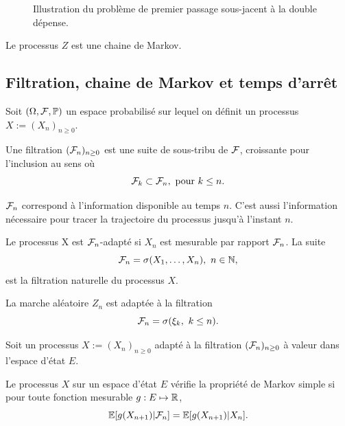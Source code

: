 \begin{figure}[ht!]
\begin{center}
\begin{tikzpicture}
\end{tikzpicture}
\end{center}
\caption{Illustration du problème de premier passage sous-jacent à la double dépense.}
\label{fig:ruin_time}
\end{figure}

Le processus $Z$ est une chaine de Markov.
\subsection{Filtration, chaine de Markov et temps d'arrêt}
Soit $(\Omega,\F, \Prob)$ un espace probabilisé sur lequel on définit un processus $X:=(X_n)_{n\geq0}$. 
\begin{definition}\label{def:filtration}
Une filtration $(\F_n)_{n\geq0}$ est une suite de sous-tribu de $\F$, croissante pour l'inclusion au sens où
$$
\F_k\subset \F_n,\text{ pour }k\leq n.
$$

\end{definition}
$\F_n$ correspond à l'information disponible au temps $n$. C'est aussi l'information nécessaire pour tracer la trajectoire du processus jusqu'à l'instant $n$.
\begin{definition}\label{def:processus_adapte}
Le processus X est $\F_n$-adapté si $X_n$ est mesurable par rapport $\F_n$. La suite
$$
\F_n = \sigma(X_1,\ldots, X_n),\text{ }n\in \N,
$$ 
est la filtration naturelle du processus $X$.
\end{definition}
\begin{ex}\label{ex:filtration_marche_aleatoire}
La marche aléatoire $Z_n$ est adaptée à la filtration $$
\F_n = \sigma(\xi_k,\text{ }k\leq n).
$$
\end{ex}
Soit un processus $X:=(X_n)_{n\geq0}$ adapté à la filtration $(\F_n)_{n\geq0}$ à valeur dans l'espace d'état $E$.
\begin{definition}\label{def:CM}
Le processus $X$ sur un espace d'état $E$ vérifie la propriété de Markov simple si pour toute fonction mesurable $g:E\mapsto \RL$,
$$
\E[g(X_{n+1})|\F_{n}] = \E[g(X_{n+1})|X_{n}].
$$

 
 \end{definition}
